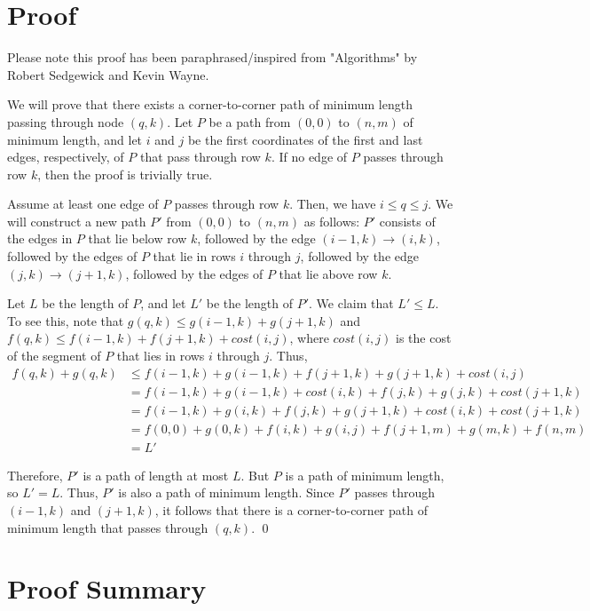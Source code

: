 \documentclass[12pt]{article}
\begin{document}
\section*{Proof}
Please note this proof has been paraphrased/inspired from "Algorithms" by Robert Sedgewick and Kevin Wayne.

We will prove that there exists a corner-to-corner path of minimum length passing through node $(q,k)$. Let $P$ be a path from $(0,0)$ to $(n,m)$ of minimum length, and let $i$ and $j$ be the first coordinates of the first and last edges, respectively, of $P$ that pass through row $k$. If no edge of $P$ passes through row $k$, then the proof is trivially true.

Assume at least one edge of $P$ passes through row $k$. Then, we have $i \leq q \leq j$. We will construct a new path $P'$ from $(0,0)$ to $(n,m)$ as follows: $P'$ consists of the edges in $P$ that lie below row $k$, followed by the edge $(i-1,k) \to (i,k)$, followed by the edges of $P$ that lie in rows $i$ through $j$, followed by the edge $(j,k) \to (j+1,k)$, followed by the edges of $P$ that lie above row $k$.

Let $L$ be the length of $P$, and let $L'$ be the length of $P'$. We claim that $L' \leq L$. To see this, note that $g(q,k) \leq g(i-1,k) + g(j+1,k)$ and $f(q,k) \leq f(i-1,k) + f(j+1,k) + cost(i,j)$, where $cost(i,j)$ is the cost of the segment of $P$ that lies in rows $i$ through $j$. Thus,
\begin{align*}
f(q,k) + g(q,k) &\leq f(i-1,k) + g(i-1,k) + f(j+1,k) + g(j+1,k) + cost(i,j) \\
&= f(i-1,k) + g(i-1,k) + cost(i,k) + f(j,k) + g(j,k) + cost(j+1,k) \\
&= f(i-1,k) + g(i,k) + f(j,k) + g(j+1,k) + cost(i,k) + cost(j+1,k) \\
&= f(0,0) + g(0,k) + f(i,k) + g(i,j) + f(j+1,m) + g(m,k) + f(n,m) \\
&= L'
\end{align*}

Therefore, $P'$ is a path of length at most $L$. But $P$ is a path of minimum length, so $L' = L$. Thus, $P'$ is also a path of minimum length. Since $P'$ passes through $(i-1,k)$ and $(j+1,k)$, it follows that there is a corner-to-corner path of minimum length that passes through $(q,k)$. \qed

\section*{Proof Summary}
\end{document}

